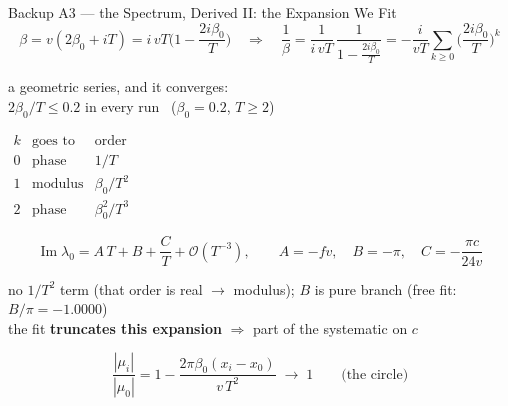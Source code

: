 \documentclass[aspectratio=169,11pt]{beamer}
\begin{document}
\begin{frame}{Backup A3 --- the Spectrum, Derived II: the Expansion We Fit}
  \vspace{-0.4em}
  \[
    \beta = v(2\beta_0 + iT) = i\,vT\Big(1 - \frac{2i\beta_0}{T}\Big)
    \quad\Longrightarrow\quad
    \frac1\beta = \frac{1}{i\,vT}\,\frac{1}{1 - \frac{2i\beta_0}{T}}
    = -\frac{i}{vT}\sum_{k\ge0}\Big(\frac{2i\beta_0}{T}\Big)^{k}
  \]
  \vspace{-0.6em}
  \begin{center}
    \begin{minipage}[c]{0.62\textwidth}\centering
      {\footnotesize\color{ink!70} a geometric series, and it converges:\\
        $2\beta_0/T \le 0.2$ in every run \ ($\beta_0 = 0.2$, $T \ge 2$)}
    \end{minipage}%
    \begin{minipage}[c]{0.30\textwidth}\centering
      {\small$
          \begin{array}{c|cc}
            k & \text{goes to} & \text{order}  \\\hline
            0 & \text{phase}   & 1/T           \\
            1 & \text{modulus} & \beta_0/T^2   \\
            2 & \text{phase}   & \beta_0^2/T^3
          \end{array}$}
    \end{minipage}
  \end{center}
  \[
    \operatorname{Im}\lambda_0 = A\,T + B + \frac{C}{T} + \mathcal{O}(T^{-3}),
    \qquad A=-fv,\quad B=-\pi,\quad C=-\frac{\pi c}{24 v}
  \]
  \begin{center}\small
    no $1/T^2$ term (that order is real $\to$ modulus); $B$ is pure branch
    (free fit: $B/\pi=-1.0000$)\\[0.3ex]
    the fit \textbf{truncates this expansion} $\Rightarrow$ part of the
    systematic on $c$
  \end{center}
  \[
    \frac{|\mu_i|}{|\mu_0|} = 1 - \frac{2\pi\beta_0 (x_i-x_0)}{v\,T^{2}}
    \;\longrightarrow\; 1
    \qquad \text{(the circle)}
  \]
\end{frame}

\end{document}
